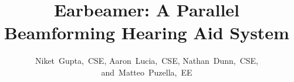 \documentclass[10pt,journal,compsoc]{IEEEtran}
\begin{document}
%
\title{Earbeamer: A Parallel Beamforming Hearing Aid System}
%
%
%
%

\author{Niket~Gupta,~CSE,
        Aaron~Lucia,~CSE,
        Nathan~Dunn,~CSE,
        and~Matteo~Puzella,~EE%
}

%
%
\end{document}
